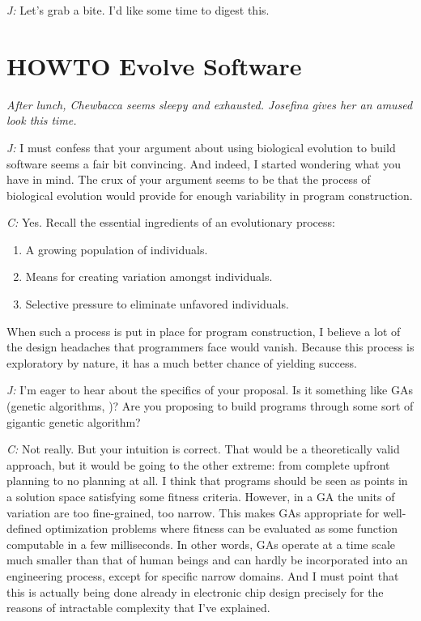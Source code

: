 \documentclass[10pt]{sigplanconf}
\begin{document}
\emph{J:} Let's grab a bite. I'd like some time to digest this. 

\section{HOWTO Evolve Software}

\emph{After lunch, Chewbacca seems sleepy and exhausted. Josefina gives her an amused look this time.}

\emph{J:} I must confess that your argument about using biological evolution to build software seems a fair bit convincing. And indeed, I started wondering what you have in mind. The crux of your argument seems to be that the process of biological evolution would provide for enough variability in program construction.

\emph{C:} Yes. Recall the essential ingredients of an evolutionary process:

\begin{enumerate}
\item A growing population of individuals.
\item Means for creating variation amongst individuals.
\item Selective pressure to eliminate unfavored individuals.
\end{enumerate}

When such a process is put in place for program construction, I believe a lot of the design headaches that programmers face would vanish. Because this process is exploratory by nature, it has a much better chance of yielding success.

\emph{J:} I'm eager to hear about the specifics of your proposal. Is it something like GAs (genetic algorithms, \cite{holland})? Are you proposing to build programs through some sort of gigantic genetic algorithm?

\emph{C:} Not really. But your intuition is correct. That would be a theoretically valid approach, but it would be going to the other extreme: from complete upfront planning to no planning at all. I think that programs should be seen as points in a solution space satisfying some fitness criteria. However, in a GA the units of variation are too fine-grained, too narrow. This makes GAs appropriate for well-defined optimization problems where fitness can be evaluated as some function computable in a few milliseconds. In other words, GAs operate at a time scale much smaller than that of human beings and can hardly be incorporated into an engineering process, except for specific narrow domains. And I must point that this is actually being done already in electronic chip design precisely for the reasons of intractable complexity that I've explained.
\end{document}
